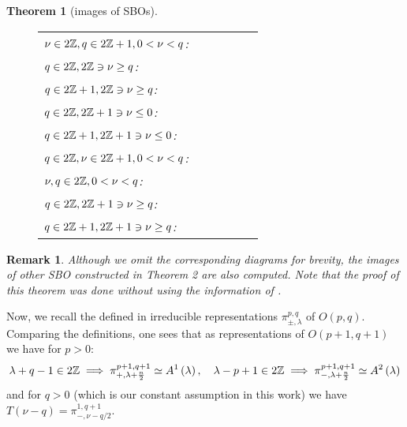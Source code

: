 \documentclass[10pt]{article} %
\newtheorem{theorem}{Theorem}
\newtheorem{remark}{Remark}
\theoremstyle{definition}
\newcommand{\even}{2\Z}
\newcommand{\odd}{2\Z+1}
\begin{document}
\begin{theorem}[images of SBOs]
\begin{figure}[H]
\begin{tabular}{p{4.5cm}cccp{2.5cm}p{2.5cm}}
		\vspace{-0.5cm}$\nu\in2\mathbb{Z},q\in2\mathbb{Z}+1,0<\nu<q$:&\\
		\vspace{-0.7cm}$q\in\even,\even\ni\nu\ge q$:&\\
		\vspace{-0.7cm}$q\in\odd,\even\ni\nu\ge q$:&\\
		\vspace{-0.7cm}$q\in\even,\odd\ni\nu\le0$:&\\
		\vspace{-0.7cm}$q\in\odd,\odd\ni\nu\le0$:&\\
		\vspace{-0.5cm}$q\in2\Z,\nu\in\odd,0<\nu<q$:&\\
		\vspace{-0.5cm}$\nu,q\in2\mathbb{Z},0<\nu<q$:&\\
		\vspace{-0.7cm}$q\in\even,\odd\ni\nu\ge q$:&\\
		\vspace{-0.7cm}$q\in\odd,\odd\ni\nu\ge q$:&\\
	\end{tabular}\end{figure}
\end{theorem}
\begin{remark}
	Although we omit the corresponding diagrams for brevity, the images of other SBO constructed in Theorem 2 are also computed. Note that
	the proof of this theorem was done \textit{without} using the information of \cite{howe1993homogeneous}.
\end{remark}
Now, we recall the defined in \cite{KO2} irreducible representations $\pi_{\pm,\lambda}^{p,q}$ of $O(p,q)$. Comparing the definitions, one sees that as 
representations of $O(p+1,q+1)$ we have for $p>0$:
\begin{equation*}
	\lambda+q-1\in2\mathbb{Z}\implies\pi_{+,\lambda+\frac{n}{2}}^{p+1,q+1}\simeq A^1\left(\lambda  \right),\quad\lambda-p+1\in2\mathbb{Z}\implies\pi_{-,\lambda+\frac{n}{2} }^{p+1,q+1}\simeq A^2\left(\lambda\right)
\end{equation*}
and for $q>0$ (which is our constant assumption in this work) we have $T(\nu-q)=\pi_{-,\nu-q/2}^{1,q+1}$.
\end{document}
